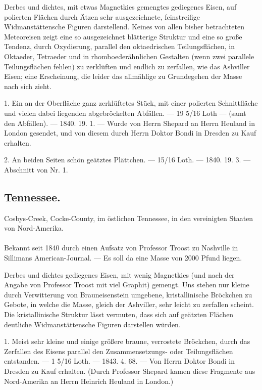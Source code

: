 \documentclass[a4paper, 11pt, oneside, polutonikogreek, german]{article}
\begin{document}
Derbes und dichtes, mit etwas Magnetkies gemengtes gediegenes Eisen, auf polierten Flächen durch Ätzen sehr ausgezeichnete, feinstreifige Widmanstättensche Figuren darstellend. Keines von allen bisher betrachteten Meteoreisen zeigt eine so ausgezeichnet blätterige Struktur und eine so große Tendenz, durch Oxydierung, parallel den oktaedrischen Teilungsflächen, in Oktaeder, Tetraeder und in rhomboederähnlichen Gestalten (wenn zwei parallele Teilungsflächen fehlen) zu zerklüften und endlich zu zerfallen, wie das Ashviller Eisen; eine Erscheinung, die leider das allmählige zu Grundegehen der Masse nach sich zieht.

1. Ein an der Oberfläche ganz zerklüftetes Stück, mit einer polierten Schnittfläche und vielen dabei liegenden abgebröckelten Abfällen. — 19 5/16 Loth — (samt den Abfällen). — 1840. 19. 1. — Wurde von Herrn Shepard an Herrn Heuland in London gesendet, und von diesem durch Herrn Doktor Bondi in Dresden zu Kauf erhalten.

2. An beiden Seiten schön geätztes Plättchen. — 15/16 Loth. — 1840. 19. 3. — Abschnitt von Nr. 1.
\subsection{Tennessee.}
\begin{center}
\small
Cosbys-Creek, Cocke-County, im östlichen Tennessee, in den vereinigten Staaten von Nord-Amerika.
\end{center}
\paragraph{}
Bekannt seit 1840 durch einen Aufsatz von Professor Troost zu Nashville in Sillimans American-Journal. — Es soll da eine Masse von 2000 Pfund liegen.

Derbes und dichtes gediegenes Eisen, mit wenig Magnetkies (und nach der Angabe von Professor Troost mit viel Graphit) gemengt. Uns stehen nur kleine durch Verwitterung von Brauneisenstein umgebene, kristallinische Bröckchen zu Gebote, in welche die Masse, gleich der Ashviller, sehr leicht zu zerfallen scheint. Die kristallinische Struktur lässt vermuten, dass sich auf geätzten Flächen deutliche Widmanstättensche Figuren darstellen würden.

1. Meist sehr kleine und einige größere braune, verrostete Bröckchen, durch das Zerfallen des Eisens parallel den Zusammensetzungs- oder Teilungsflächen entstanden. — 1 5/16 Loth. — 1843. 4. 68. — Von Herrn Doktor Bondi in Dresden zu Kauf erhalten. (Durch Professor Shepard kamen diese Fragmente aus Nord-Amerika an Herrn Heinrich Heuland in London.)
\end{document}
